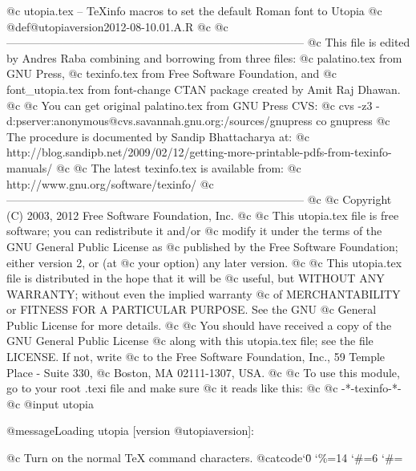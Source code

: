 @c utopia.tex -- TeXinfo macros to set the default Roman font to Utopia
@c
@def@utopiaversion{2012-08-10.01.A.R}
@c
@c--------------------------------------------------------------------------------
@c This file is edited by Andres Raba combining and borrowing from three files: 
@c palatino.tex from GNU Press,
@c texinfo.tex from Free Software Foundation, and
@c font_utopia.tex from font-change CTAN package created by Amit Raj Dhawan.
@c 
@c You can get original palatino.tex from GNU Press CVS:
@c cvs -z3 -d:pserver:anonymous@cvs.savannah.gnu.org:/sources/gnupress co gnupress
@c The procedure is documented by Sandip Bhattacharya at:
@c http://blog.sandipb.net/2009/02/12/getting-more-printable-pdfs-from-texinfo-manuals/
@c
@c The latest texinfo.tex is available from:
@c http://www.gnu.org/software/texinfo/
@c--------------------------------------------------------------------------------
@c
@c Copyright (C) 2003, 2012  Free Software Foundation, Inc.
@c
@c This utopia.tex file is free software; you can redistribute it and/or
@c modify it under the terms of the GNU General Public License as
@c published by the Free Software Foundation; either version 2, or (at
@c your option) any later version.
@c
@c This utopia.tex file is distributed in the hope that it will be
@c useful, but WITHOUT ANY WARRANTY; without even the implied warranty
@c of MERCHANTABILITY or FITNESS FOR A PARTICULAR PURPOSE.  See the GNU
@c General Public License for more details.
@c
@c You should have received a copy of the GNU General Public License
@c along with this utopia.tex file; see the file LICENSE.  If not, write
@c to the Free Software Foundation, Inc., 59 Temple Place - Suite 330,
@c Boston, MA 02111-1307, USA.
@c
@c To use this module, go to your root .texi file and make sure
@c it reads like this:
@c       @c -*-texinfo-*-
@c     @input utopia

@message{Loading utopia [version @utopiaversion]:}

@c Turn on the normal TeX command characters.
@catcode`\=0
\catcode`\%=14
\catcode`\#=6
\let\setfontorig=\setfont
\def\setfont#1#2#3#4{\font#1=#2#3 at #4}
\catcode`\#=\other

\def\rmfontprefix{mdput}

\def\rmshape{r7t}
\def\rmbshape{b7t}
\def\bfshape{b7t}
\def\bxshape{b7t}
\def\itshape{ri7t}
\def\itbshape{bi7t}
\def\slshape{ro7t}
\def\slbshape{bo7t}
\def\scshape{rfc8t}
\def\scbshape{bfc8t}

